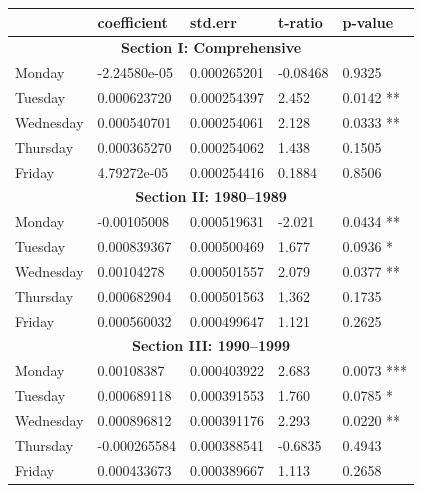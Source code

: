 \documentclass[11pt, english]{article}
\begin{document}
	\begin{table}[h]
                \scriptsize
		\renewcommand{\arraystretch}{1.25}
        \begin{center}
        \begin{tabular}{p{2cm}p{2cm}p{2cm}p{2cm}p{2cm}}
                & \textbf{coefficient} & \textbf{std.err} & \textbf{t-ratio} & \textbf{p-value}\\
                \hline
                \multicolumn{5}{c}{\textbf{Section I: Comprehensive}}\\
                \hline
                Monday & -2.24580e-05 & 0.000265201 & -0.08468 & 0.9325\\
                Tuesday & 0.000623720 & 0.000254397 & 2.452 & 0.0142 **\\
                Wednesday & 0.000540701 & 0.000254061 & 2.128 & 0.0333 **\\
                Thursday & 0.000365270 & 0.000254062 & 1.438 & 0.1505\\
                Friday & 4.79272e-05 & 0.000254416 & 0.1884 & 0.8506\\
                \hline
                \multicolumn{5}{c}{\textbf{Section II: 1980--1989}}\\
                \hline            
                Monday & -0.00105008 & 0.000519631 & -2.021 & 0.0434 **\\   
                Tuesday & 0.000839367 & 0.000500469 & 1.677 & 0.0936 *\\  
                Wednesday & 0.00104278 & 0.000501557 & 2.079 & 0.0377 **\\
                Thursday & 0.000682904 & 0.000501563 & 1.362 & 0.1735\\
                Friday & 0.000560032 & 0.000499647 & 1.121 & 0.2625\\
                \hline                                             
                \multicolumn{5}{c}{\textbf{Section III: 1990--1999}}\\
                \hline            
                Monday & 0.00108387 & 0.000403922 & 2.683 & 0.0073 ***\\   
                Tuesday & 0.000689118 & 0.000391553 & 1.760 & 0.0785 *\\  
                Wednesday & 0.000896812 & 0.000391176 & 2.293 & 0.0220 **\\
                Thursday & -0.000265584 & 0.000388541 & -0.6835 & 0.4943\\
                Friday & 0.000433673 & 0.000389667 & 1.113 & 0.2658\\  

\end{tabular}
\end{center}
\end{table}
\end{document}

